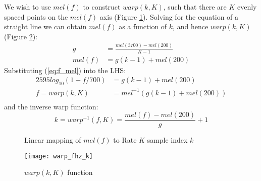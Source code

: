 \documentclass{article}
\begin{document}
We wish to use $mel(f)$ to construct $warp(k,K)$, such that there are $K$ evenly spaced points on the $mel(f)$ axis (Figure \ref{fig:mel_k}).  Solving for the equation of a straight line we can obtain $mel(f)$ as a function of $k$, and hence $warp(k,K)$ (Figure \ref{fig:warp_fhz_k}):
\begin{equation} \label{eq:mel_k}
\begin{split}
g &= \frac{mel(3700)-mel(200)}{K-1} \\
mel(f) &= g(k-1) + mel(200)
\end{split}
\end{equation}
Substituting (\ref{eq:f_mel}) into the LHS:
\begin{equation} \label{eq:warp}
\begin{split}
2595log_{10}(1+f/700) &= g(k-1) + mel(200) \\
f = warp(k,K) &= mel^{-1} ( g(k-1) + mel(200) ) \\
\end{split}
\end{equation}
and the inverse warp function:
\begin{equation} \label{warp_inv}
k = warp^{-1}(f,K) = \frac{mel(f)-mel(200)}{g} + 1
\end{equation}

\begin{figure}[h]
\caption{Linear mapping of $mel(f)$ to Rate $K$ sample index $k$}
\vspace{5mm}
\label{fig:mel_k}
\centering
{}
\end{figure}

\begin{figure}[h]
\caption{$warp(k,K)$ function}
\label{fig:warp_fhz_k}
\texttt{[image: warp\_fhz\_k]}
\end{figure}
\end{document}
